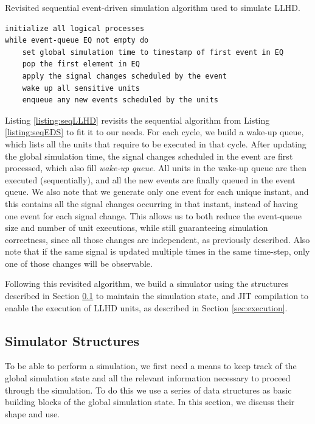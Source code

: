 \begin{listing}[ht]
    \caption{Revisited sequential event-driven simulation algorithm used to simulate LLHD.}
    \label{listing:seqLLHD}
    \begin{verbatim}
initialize all logical processes
while event-queue EQ not empty do
    set global simulation time to timestamp of first event in EQ
    pop the first element in EQ
    apply the signal changes scheduled by the event
    wake up all sensitive units
    enqueue any new events scheduled by the units
\end{verbatim}
\end{listing}

Listing \ref{listing:seqLLHD} revisits the sequential algorithm from Listing \ref{listing:seqEDS} to fit it to our needs. For each cycle, we build a wake-up queue, which lists all the units that require to be executed in that cycle. After updating the global simulation time, the signal changes scheduled in the event are first processed, which also fill \textit{wake-up queue}. All units in the wake-up queue are then executed (sequentially), and all the new events are finally queued in the event queue. We also note that we generate only one event for each unique instant, and this contains all the signal changes occurring in that instant, instead of having one event for each signal change. This allows us to both reduce the event-queue size and number of unit executions, while still guaranteeing simulation correctness, since all those changes are independent, as previously described. Also note that if the same signal is updated multiple times in the same time-step, only one of those changes will be observable.

Following this revisited algorithm, we build a simulator using the structures described in Section \ref{sec:structs} to maintain the simulation state, and JIT compilation to enable the execution of LLHD units, as described in Section \ref{sec:execution}.


\subsection{Simulator Structures}
\label{sec:structs}
To be able to perform a simulation, we first need a means to keep track of the global simulation state and all the relevant information necessary to proceed through the simulation. To do this we use a series of data structures as basic building blocks of the global simulation state. In this section, we discuss their shape and use.

